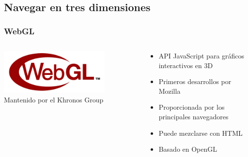 %
%

{\bf
  \textcolor[rgb]{1,1,1}{
    \section{Navegar en tres dimensiones}
  }
}

\usebackgroundtemplate{}

\begin{frame}
\frametitle{WebGL}

\begin{columns}[T]
  \begin{column}{.40\textwidth}
    \includegraphics[width=5.5cm]{figs/webgl-logo}
    \vspace{2cm}
    {\Large
      Mantenido por el Khronos Group
    }
  \end{column}%
  \hfill%
  \begin{column}{.58\textwidth}
    {\Large
      \begin{itemize}
      \item API JavaScript para gráficos interactivos en 3D
      \item Primeros desarrollos por Mozilla
      \item Proporcionada por los principales navegadores
      \item Puede mezclarse con HTML
      \item Basado en OpenGL
      \end{itemize}
    }
  \end{column}%
\end{columns}

\end{frame}

